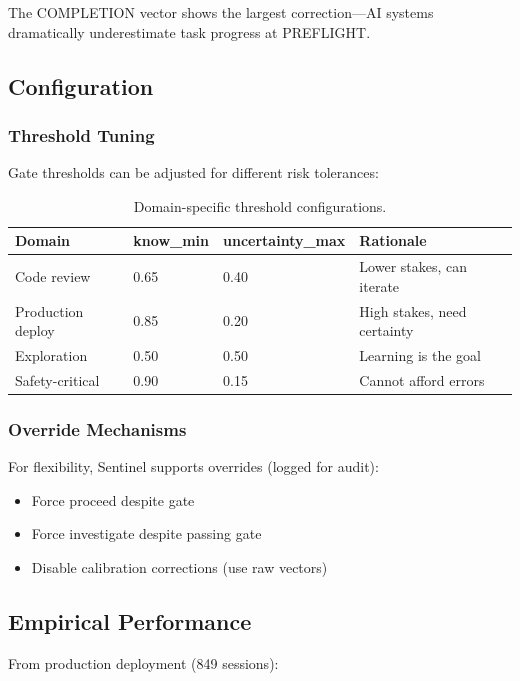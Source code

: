 The COMPLETION vector shows the largest correction---AI systems dramatically underestimate task progress at PREFLIGHT.

\subsection{Configuration}

\subsubsection{Threshold Tuning}

Gate thresholds can be adjusted for different risk tolerances:

\begin{table}[h]
\centering
\begin{tabular}{llll}
\toprule
\textbf{Domain} & \textbf{know\_min} & \textbf{uncertainty\_max} & \textbf{Rationale} \\
\midrule
Code review & 0.65 & 0.40 & Lower stakes, can iterate \\
Production deploy & 0.85 & 0.20 & High stakes, need certainty \\
Exploration & 0.50 & 0.50 & Learning is the goal \\
Safety-critical & 0.90 & 0.15 & Cannot afford errors \\
\bottomrule
\end{tabular}
\caption{Domain-specific threshold configurations.}
\label{tab:domain-thresholds}
\end{table}

\subsubsection{Override Mechanisms}

For flexibility, Sentinel supports overrides (logged for audit):
\begin{itemize}
    \item Force proceed despite gate
    \item Force investigate despite passing gate
    \item Disable calibration corrections (use raw vectors)
\end{itemize}

\subsection{Empirical Performance}

From production deployment (849 sessions):

